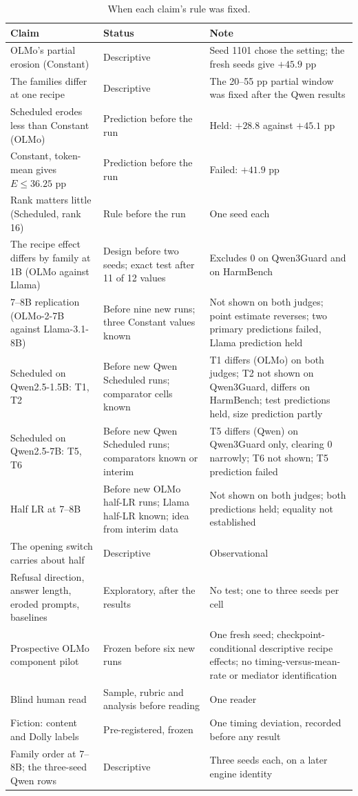 \documentclass{article}
\begin{document}
\begin{table}[!htbp]
  \caption{When each claim's rule was fixed.}
  \label{tab:claims}
  \centering
  \footnotesize
  \begin{tabular}{@{}L{4.8cm}L{3.4cm}L{6.4cm}@{}}
    \toprule
    Claim & Status & Note \\
    \midrule
    OLMo's partial erosion (Constant) & Descriptive & Seed 1101 chose the setting; the fresh seeds give $+45.9$ pp \\
    The families differ at one recipe & Descriptive & The 20--55 pp partial window was fixed after the Qwen results \\
    Scheduled erodes less than Constant (OLMo) & Prediction before the run & Held: $+28.8$ against $+45.1$ pp \\
    Constant, token-mean gives $E \le 36.25$ pp & Prediction before the run & Failed: $+41.9$ pp \\
    Rank matters little (Scheduled, rank 16) & Rule before the run & One seed each \\
    The recipe effect differs by family at 1B (OLMo against Llama) & Design before two seeds; exact test after 11 of 12 values & Excludes 0 on Qwen3Guard and on HarmBench \\
    7--8B replication (OLMo-2-7B against Llama-3.1-8B) & Before nine new runs; three Constant values known & Not shown on both judges; point estimate reverses; two primary predictions failed, Llama prediction held \\
    Scheduled on Qwen2.5-1.5B: T1, T2 & Before new Qwen Scheduled runs; comparator cells known & T1 differs (OLMo) on both judges; T2 not shown on Qwen3Guard, differs on HarmBench; test predictions held, size prediction partly \\
    Scheduled on Qwen2.5-7B: T5, T6 & Before new Qwen Scheduled runs; comparators known or interim & T5 differs (Qwen) on Qwen3Guard only, clearing 0 narrowly; T6 not shown; T5 prediction failed \\
    Half LR at 7--8B & Before new OLMo half-LR runs; Llama half-LR known; idea from interim data & Not shown on both judges; both predictions held; equality not established \\
    The opening switch carries about half & Descriptive & Observational \\
    Refusal direction, answer length, eroded prompts, baselines & Exploratory, after the results & No test; one to three seeds per cell \\
    Prospective OLMo component pilot & Frozen before six new runs & One fresh seed; checkpoint-conditional descriptive recipe effects; no timing-versus-mean-rate or mediator identification \\
    Blind human read & Sample, rubric and analysis before reading & One reader \\
    Fiction: content and Dolly labels & Pre-registered, frozen & One timing deviation, recorded before any result \\
    Family order at 7--8B; the three-seed Qwen rows & Descriptive & Three seeds each, on a later engine identity \\
    \bottomrule
  \end{tabular}
\end{table}
\end{document}
